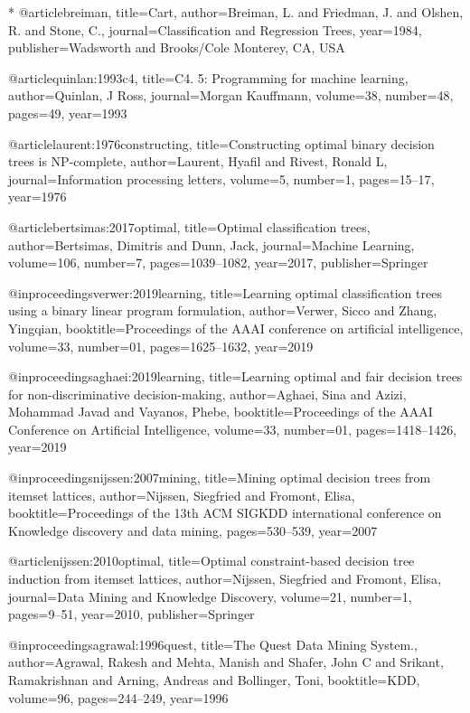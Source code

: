 *
@article{breiman,
  title={Cart},
  author={Breiman, L. and Friedman, J. and Olshen, R. and Stone, C.},
  journal={Classification and Regression Trees},
  year={1984},
  publisher={Wadsworth and Brooks/Cole Monterey, CA, USA}
}

@article{quinlan:1993c4,
	title={C4. 5: Programming for machine learning},
	author={Quinlan, J Ross},
	journal={Morgan Kauffmann},
	volume={38},
	number={48},
	pages={49},
	year={1993}
}

@article{laurent:1976constructing,
	title={Constructing optimal binary decision trees is NP-complete},
	author={Laurent, Hyafil and Rivest, Ronald L},
	journal={Information processing letters},
	volume={5},
	number={1},
	pages={15--17},
	year={1976}
}


@article{bertsimas:2017optimal,
	title={Optimal classification trees},
	author={Bertsimas, Dimitris and Dunn, Jack},
	journal={Machine Learning},
	volume={106},
	number={7},
	pages={1039--1082},
	year={2017},
	publisher={Springer}
}

@inproceedings{verwer:2019learning,
	title={Learning optimal classification trees using a binary linear program formulation},
	author={Verwer, Sicco and Zhang, Yingqian},
	booktitle={Proceedings of the AAAI conference on artificial intelligence},
	volume={33},
	number={01},
	pages={1625--1632},
	year={2019}
}

@inproceedings{aghaei:2019learning,
	title={Learning optimal and fair decision trees for non-discriminative decision-making},
	author={Aghaei, Sina and Azizi, Mohammad Javad and Vayanos, Phebe},
	booktitle={Proceedings of the AAAI Conference on Artificial Intelligence},
	volume={33},
	number={01},
	pages={1418--1426},
	year={2019}
}


@inproceedings{nijssen:2007mining,
	title={Mining optimal decision trees from itemset lattices},
	author={Nijssen, Siegfried and Fromont, Elisa},
	booktitle={Proceedings of the 13th ACM SIGKDD international conference on Knowledge discovery and data mining},
	pages={530--539},
	year={2007}
}

@article{nijssen:2010optimal,
	title={Optimal constraint-based decision tree induction from itemset lattices},
	author={Nijssen, Siegfried and Fromont, Elisa},
	journal={Data Mining and Knowledge Discovery},
	volume={21},
	number={1},
	pages={9--51},
	year={2010},
	publisher={Springer}
}


@inproceedings{agrawal:1996quest,
	title={The Quest Data Mining System.},
	author={Agrawal, Rakesh and Mehta, Manish and Shafer, John C and Srikant, Ramakrishnan and Arning, Andreas and Bollinger, Toni},
	booktitle={KDD},
	volume={96},
	pages={244--249},
	year={1996}
}

